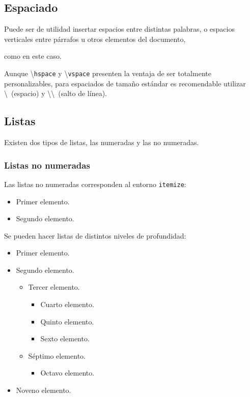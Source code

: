 \subsection{Espaciado}

Puede ser de utilidad insertar \hspace{0.5cm} espacios \hspace{1cm} entre distintas \hspace{2cm} palabras, o espacios verticales entre párrafos u otros elementos del documento,

\vspace{6cm}

como en este caso.

Aunque \textbackslash\texttt{hspace} y \textbackslash\texttt{vspace} presenten la ventaja de ser totalmente personalizables, para espaciados de tamaño estándar es recomendable utilizar \textbackslash \ (espacio) y \textbackslash\textbackslash \ (salto de línea).


\subsection{Listas}

Existen dos tipos de listas, las numeradas y las no numeradas.


\subsubsection{Listas no numeradas}

Las listas no numeradas corresponden al entorno \texttt{itemize}:

\begin{itemize}
    \item Primer elemento.
    \item Segundo elemento.
\end{itemize}

Se pueden hacer listas de distintos niveles de profundidad:

\begin{itemize}
    \item Primer elemento.
    \item Segundo elemento.
    \begin{itemize}
        \item Tercer elemento.
        \begin{itemize}
            \item Cuarto elemento.
            \item Quinto elemento.
        \item Sexto elemento.
        \end{itemize}
        \item Séptimo elemento.
        \begin{itemize}
            \item Octavo elemento.
        \end{itemize}
    \end{itemize}
    \item Noveno elemento.
\end{itemize}


